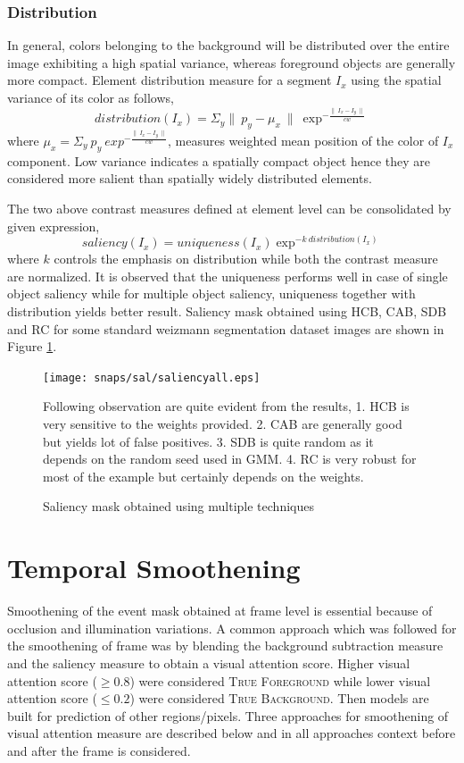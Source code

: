 \subsubsection{Distribution}
In general, colors belonging to the background will be distributed over the entire image exhibiting a high spatial variance, whereas foreground objects are generally more compact.  Element distribution measure for a segment $I_{x}$ using the spatial variance of its color as follows,
$$distribution(I_{x}) = \Sigma_{y} \parallel~p_{y} -\mu_{x}~\parallel~\exp^{-\frac{\parallel~I_{x} - I_{y}~\parallel}{cw}}$$ 
where $\mu_{x} = \Sigma_{y}~p_{y}~exp^{-\frac{\parallel~I_{x} - I_{y}~\parallel}{cw}}$, measures weighted mean position of the color of $I_{x}$ component.  Low variance indicates a spatially compact object hence they are considered more salient than spatially widely distributed elements.

\par The two above contrast measures defined at element level can be consolidated by given expression,
$$saliency(I_{x}) = uniqueness(I_{x}) \exp^{-k~distribution(I_{x})}$$
where $k$ controls the emphasis on distribution while both the contrast measure are normalized. It is observed that the uniqueness performs well in case of single object saliency while for multiple object saliency, uniqueness together with distribution yields better result.  Saliency mask obtained using HCB, CAB, SDB and RC for some standard weizmann segmentation dataset images are shown in Figure \ref{fig:sal}. 

\begin{figure}[htpb]
   \begin{center}
	    \texttt{[image: snaps/sal/saliencyall.eps]}     
     \caption {Saliency mask obtained using multiple techniques}
     \medskip \small 
     Following observation are quite evident from the results, 1. HCB is very sensitive to the weights provided. 2. CAB are generally good but yields lot of false positives. 3. SDB is quite random as it depends on the random seed used in GMM. 4. RC is very robust for most of the example but certainly depends on the weights.
   \label{fig:sal}
   \end{center}
 \end{figure}

 \section{Temporal Smoothening}
  \label{sec:ts}
Smoothening of the event mask obtained at frame level is essential because of occlusion and illumination variations.  A common approach which was followed for the smoothening of frame was by blending the background subtraction measure and the saliency measure to obtain a visual attention score. Higher visual attention score ($\geqslant0.8$) were considered \textsc{True Foreground} while lower visual attention score ($\leqslant0.2$)  were considered \textsc{True Background}.  Then models are built for prediction of other regions/pixels.  Three approaches for smoothening of visual attention measure are described below and in all approaches context before and after the frame is considered.

